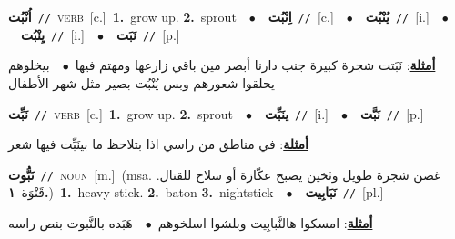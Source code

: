 \documentclass[10pt,a4paper,twoside]{article} %
\begin{document}
\begin{multicols}{2}
{{{\setlength\topsep{0pt}\textbf{\foreignlanguage{arabic}{اُنْبُت}}\ {\color{gray}\texttt{//}\color{black}}\ \textsc{verb}\ [c.]\ \textbf{1.}~grow up.  \textbf{2.}~sprout\ \ $\bullet$\ \ \setlength\topsep{0pt}\textbf{\foreignlanguage{arabic}{اِنْبُت}}\ {\color{gray}\texttt{//}\color{black}}\ [c.]\ \ $\bullet$\ \ \setlength\topsep{0pt}\textbf{\foreignlanguage{arabic}{يُنْبُت}}\ {\color{gray}\texttt{//}\color{black}}\ [i.]\ \ $\bullet$\ \ \setlength\topsep{0pt}\textbf{\foreignlanguage{arabic}{يِنْبُت}}\ {\color{gray}\texttt{//}\color{black}}\ [i.]\ \ $\bullet$\ \ \setlength\topsep{0pt}\textbf{\foreignlanguage{arabic}{نَبَت}}\ {\color{gray}\texttt{//}\color{black}}\ [p.]\  \begin{flushright}\color{gray}\foreignlanguage{arabic}{\textbf{\underline{\foreignlanguage{arabic}{أمثلة}}}: نَبَتت شجرة كبيرة جنب دارنا أبصر مين باقي زارعها ومهتم فيها\ $\bullet$\ \  بيخلوهم يحلقوا شعورهم وبس يُنْبُت بصير مثل شهر الأطفال}\end{flushright}\color{black}} \vspace{2mm}

{\setlength\topsep{0pt}\textbf{\foreignlanguage{arabic}{نَبِّت}}\ {\color{gray}\texttt{//}\color{black}}\ \textsc{verb}\ [c.]\ \textbf{1.}~grow up.  \textbf{2.}~sprout\ \ $\bullet$\ \ \setlength\topsep{0pt}\textbf{\foreignlanguage{arabic}{ينَبِّت}}\ {\color{gray}\texttt{//}\color{black}}\ [i.]\ \ $\bullet$\ \ \setlength\topsep{0pt}\textbf{\foreignlanguage{arabic}{نَبَّت}}\ {\color{gray}\texttt{//}\color{black}}\ [p.]\  \begin{flushright}\color{gray}\foreignlanguage{arabic}{\textbf{\underline{\foreignlanguage{arabic}{أمثلة}}}: في مناطق من راسي اذا بتلاحظ ما بينَبِّت فيها شعر}\end{flushright}\color{black}} \vspace{2mm}

{\setlength\topsep{0pt}\textbf{\foreignlanguage{arabic}{نَبُّوت}}\ {\color{gray}\texttt{//}\color{black}}\ \textsc{noun}\ [m.]\ \color{gray}(msa. \foreignlanguage{arabic}{غصن شجرة طويل وثخين يصبح عكّازة أو سلاح للقتال. قَنْوَة}~\foreignlanguage{arabic}{\textbf{١.}})\color{black}\ \textbf{1.}~heavy stick.  \textbf{2.}~baton  \textbf{3.}~nightstick\ \ $\bullet$\ \ \setlength\topsep{0pt}\textbf{\foreignlanguage{arabic}{نَبَابِيت}}\ {\color{gray}\texttt{//}\color{black}}\ [pl.]\  \begin{flushright}\color{gray}\foreignlanguage{arabic}{\textbf{\underline{\foreignlanguage{arabic}{أمثلة}}}: امسكوا هالنَّبابِيت وبلشوا اسلخوهم\ $\bullet$\ \  هَبَده بالنَّبوت بنص راسه}\end{flushright}\color{black}} \vspace{2mm}

}}
\end{multicols}
\end{document}
